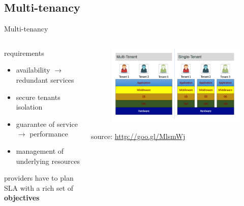 \subsection{Multi-tenancy}
\begin{frame}{Multi-tenancy}
	\only<1>
	{
		\begin{columns}
			\begin{column}{0.57\textwidth}
				requirements
				\begin{itemize}
					\item{\footnotesize{availability $\rightarrow{}$ redundant services}}
					\item{\footnotesize{secure tenants isolation}}
					\item{\footnotesize{guarantee of service $\rightarrow$ performance}}
					\item{\footnotesize{management of underlying resources}}
				\end{itemize}
				\begin{center}
					providers have to plan SLA with a rich set of \textbf{objectives}
				\end{center}
			\end{column}
			\begin{column}{0.43\textwidth}
				\begin{figure}
					\centering{}
					\includegraphics[scale=0.21]{images/multi-tenancy.png}
				\end{figure}
				\begin{flushright}
					\tiny{source: \url{http://goo.gl/MlsmWj}}
				\end{flushright}
			\end{column}
		\end{columns}
	}
	\only<2>
	{
		\begin{columns}
			\begin{column}{0.57\textwidth}

\end{column}
\end{columns}}
\end{frame}
